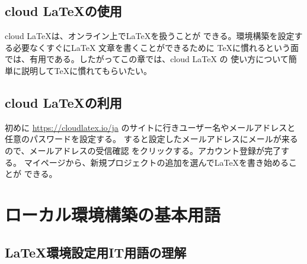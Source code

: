 \documentclass{ltjsarticle}
\begin{document}
\subsection{cloud \LaTeX の使用}
cloud \LaTeX は、オンライン上で\LaTeX を扱うことが
できる。環境構築を設定する必要なくすぐにLaTeX 文章を書くことができるために
TeXに慣れるという面では、有用である。したがってこの章では、cloud LaTeX の
使い方について簡単に説明して\TeX に慣れてもらいたい。
\subsection{cloud \LaTeX の利用}
初めに
\url{https://cloudlatex.io/ja}
のサイトに行きユーザー名やメールアドレスと任意のパスワードを設定する。
すると設定したメールアドレスにメールが来るので、メールアドレスの受信確認
をクリックする。アカウント登録が完了する。
マイページから、新規プロジェクトの追加を選んで\LaTeX を書き始めることが
できる。

\section{ローカル環境構築の基本用語}
\subsection{\LaTeX 環境設定用IT用語の理解}
\end{document}
